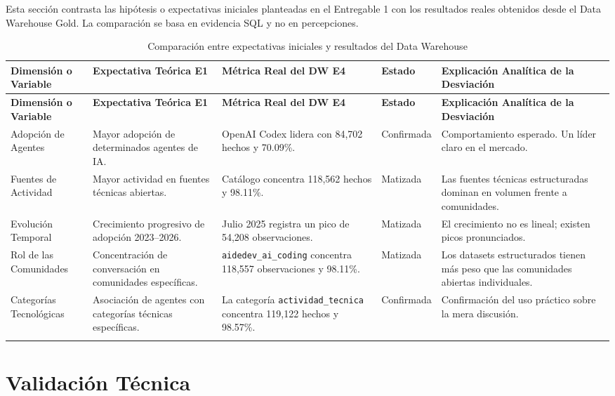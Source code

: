 \documentclass[12pt,a4paper]{article}
\begin{document}
Esta secci\'on contrasta las hip\'otesis o expectativas iniciales planteadas en el Entregable 1 con los resultados reales obtenidos desde el Data Warehouse Gold. La comparaci\'on se basa en evidencia SQL y no en percepciones.

\scriptsize
\begin{longtable}{|P{3cm}|P{3.5cm}|P{3.5cm}|P{1.5cm}|P{3.5cm}|}
\hline
{}
\textbf{Dimensi\'on o Variable} & \textbf{Expectativa Te\'orica E1} & \textbf{M\'etrica Real del DW E4} & \textbf{Estado} & \textbf{Explicaci\'on Anal\'itica de la Desviaci\'on} \\ \hline
\endfirsthead
\hline
{}
\textbf{Dimensi\'on o Variable} & \textbf{Expectativa Te\'orica E1} & \textbf{M\'etrica Real del DW E4} & \textbf{Estado} & \textbf{Explicaci\'on Anal\'itica de la Desviaci\'on} \\ \hline
\endhead
Adopci\'on de Agentes & Mayor adopci\'on de determinados agentes de IA. & OpenAI Codex lidera con 84,702 hechos y 70.09\%. & Confirmada & Comportamiento esperado. Un l\'ider claro en el mercado. \\ \hline
Fuentes de Actividad & Mayor actividad en fuentes t\'ecnicas abiertas. & Cat\'alogo concentra 118,562 hechos y 98.11\%. & Matizada & Las fuentes t\'ecnicas estructuradas dominan en volumen frente a comunidades. \\ \hline
Evoluci\'on Temporal & Crecimiento progresivo de adopci\'on 2023--2026. & Julio 2025 registra un pico de 54,208 observaciones. & Matizada & El crecimiento no es lineal; existen picos pronunciados. \\ \hline
Rol de las Comunidades & Concentraci\'on de conversaci\'on en comunidades espec\'ificas. & \texttt{aidedev\_ai\_coding} concentra 118,557 observaciones y 98.11\%. & Matizada & Los datasets estructurados tienen m\'as peso que las comunidades abiertas individuales. \\ \hline
Categor\'ias Tecnol\'ogicas & Asociaci\'on de agentes con categor\'ias t\'ecnicas espec\'ificas. & La categor\'ia \texttt{actividad\_tecnica} concentra 119,122 hechos y 98.57\%. & Confirmada & Confirmaci\'on del uso pr\'actico sobre la mera discusi\'on. \\ \hline
\caption{Comparaci\'on entre expectativas iniciales y resultados del Data Warehouse}
\end{longtable}
\normalsize

\section{Validaci\'on T\'ecnica}
\end{document}
